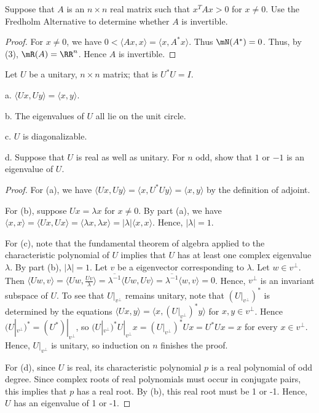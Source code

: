\documentclass{article}
\begin{document}
 Suppose that $A$ is an $n \times n$ real matrix such that $x^T A x > 0 $ for $x\neq 0$. Use the Fredholm Alternative to determine whether $A$ is invertible.
\begin{proof}
For $x \neq 0$, we have $0 < \langle Ax, x \rangle = \langle x, A^*x \rangle$. Thus $\mN(A^*) = 0$. Thus, by (3), $\mR(A) = \RR^n$. Hence $A$ is invertible.
\end{proof}

 Let $U$ be a unitary, $n\times n$ matrix; that is $U^* U = I$. 

a. $\langle Ux, Uy \rangle = \langle x, y \rangle$.

b. The eigenvalues of $U$ all lie on the unit circle.

c. $U$ is diagonalizable.

d. Suppose that $U$ is real as well as unitary. For $n$ odd, show that $1$ or $-1$ is an eigenvalue of $U$.

\begin{proof}
For (a), we have $\langle Ux, Uy \rangle = \langle x, U^* U y \rangle = \langle x , y \rangle$ by the definition of adjoint.

For (b), suppose $U x = \lambda x$ for $x \neq 0$.  By part (a), we have $\langle x, x \rangle = \langle Ux, Ux \rangle = \langle \lambda x , \lambda x \rangle = |\lambda| \langle x, x \rangle$. Hence, $|\lambda| = 1$.

For (c), note that the fundamental theorem of algebra applied to the characteristic polynomial of $U$ implies that $U$ has at least one complex eigenvalue $\lambda$. By part (b), $|\lambda| = 1$.  Let $v$ be a eigenvector corresponding to $\lambda$.  Let $w \in v^\perp$. Then $\langle Uw, v \rangle = \langle Uw , \frac {Uv} {\lambda} \rangle = \overline {\lambda^{-1}} \langle Uw, Uv \rangle = \overline {\lambda^{-1}} \langle w, v \rangle = 0$.  Hence, $v^\perp$ is an invariant subspace of $U$. To see that $U|_{v^\perp}$ remains unitary, note that $(U|_{v^\perp})^*$ is determined by the equations $\langle U x, y \rangle = \langle x, (U|_{v^\perp})^* y\rangle$ for $x,y \in v^\perp$. Hence $(U|_{v^\perp})^* = (U^*)|_{v^\perp}$, so $(U|_{v^\perp})^* U|_{v^\perp} x = (U|_{v^\perp})^* U x = U^* U x = x$ for every $x \in v^\perp$.  Hence, $U|_{v^\perp}$ is unitary, so induction on $n$ finishes the proof.

For (d), since $U$ is real, its characteristic polynomial $p$ is a real polynomial of odd degree. Since complex roots of real polynomials must occur in conjugate pairs, this implies that $p$ has a real root.  By (b), this real root must be 1 or -1. Hence, $U$ has an eigenvalue of 1 or -1.
\end{proof}
\end{document}
